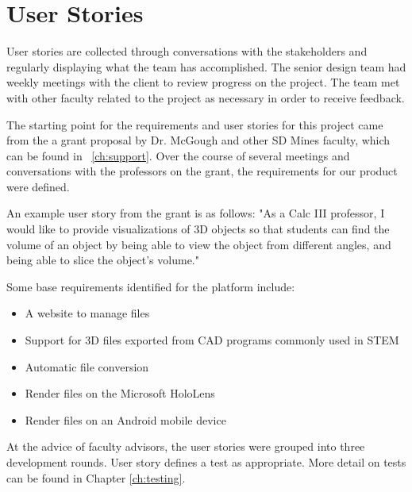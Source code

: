 \section{User Stories}

User stories are collected through conversations with the stakeholders and
regularly displaying what the team has accomplished. The senior design team had
weekly meetings with the client to review progress on the project. The team met
with other faculty related to the project as necessary in order to receive
feedback.

The starting point for the requirements and user stories for this project came
from the a grant proposal by Dr. McGough and other SD Mines faculty,
which can be found in ~\autoref{ch:support}. Over the course of several
meetings and conversations with the professors on the grant, the
requirements for our product were defined.

An example user story from the grant is as follows: "As a Calc III
professor, I would like to provide visualizations of 3D objects so that
students can find the volume of an object by being able to view the object
from different angles, and being able to slice the object's volume."

Some base requirements identified for the platform include:
\begin{itemize}
	\item A website to manage files
	\item Support for 3D files exported from CAD programs commonly used in STEM
	\item Automatic file conversion
	\item Render files on the Microsoft HoloLens
	\item Render files on an Android mobile device
\end{itemize}

At the advice of faculty advisors, the user stories were grouped into three 
development rounds. User story defines a test as appropriate. More detail on tests can be found in Chapter \ref{ch:testing}.



